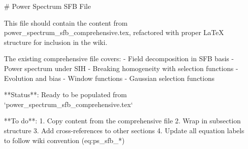 # Power Spectrum SFB File

This file should contain the content from power_spectrum_sfb_comprehensive.tex, 
refactored with proper LaTeX structure for inclusion in the wiki.

The existing comprehensive file covers:
- Field decomposition in SFB basis
- Power spectrum under SIH
- Breaking homogeneity with selection functions
- Evolution and bias
- Window functions
- Gaussian selection functions

**Status**: Ready to be populated from `power_spectrum_sfb_comprehensive.tex`

**To do**: 
1. Copy content from the comprehensive file
2. Wrap in subsection structure
3. Add cross-references to other sections
4. Update all equation labels to follow wiki convention (eq:ps_sfb_*)
